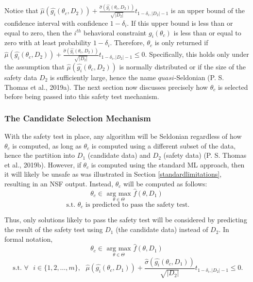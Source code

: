 \documentclass[12pt, twoside]{amherstthesis}
\begin{document}
Notice that \(\hat{\mu}(\hat{g_i}(\theta_c, D_2)) + \frac{\hat{\sigma}(\hat{g_i}(\theta_c, D_2))}{\sqrt{|D_2|}}t_{1-\delta_i, |D_2|-1}\) is an upper bound of the confidence interval with confidence \(1-\delta_i\). If this upper bound is less than or equal to zero, then the \(i^{th}\) behavioral constraint \(g_i(\theta_c)\) is less than or equal to zero with at least probability \(1-\delta_i\). Therefore, \(\theta_c\) is only returned if \(\hat{\mu}(\hat{g_i}(\theta_c, D_2)) + \frac{\hat{\sigma}(\hat{g_i}(\theta_c, D_2))}{\sqrt{|D_2|}}t_{1-\delta_i, |D_2|-1} \leq 0\). Specifically, this holds only under the assumption that \(\hat{\mu}(\hat{g_i}(\theta_c, D_2))\) is normally distributed or if the size of the safety data \(D_2\) is sufficiently large, hence the name \(\textit{quasi}\)-Seldonian (P. S. Thomas et al., 2019a). The next section now discusses precisely how \(\theta_c\) is selected before being passed into this safety test mechanism.

\hypertarget{candidate}{%
\subsubsection{The Candidate Selection Mechanism}\label{candidate}}

With the safety test in place, any algorithm will be Seldonian regardless of how \(\theta_c\) is computed, as long as \(\theta_c\) is computed using a different subset of the data, hence the partition into \(D_1\) (candidate data) and \(D_2\) (safety data) (P. S. Thomas et al., 2019b). However, if \(\theta_c\) is computed using the standard ML approach, then it will likely be unsafe as was illustrated in Section \ref{standardlimitations}, resulting in an NSF output. Instead, \(\theta_c\) will be computed as follows:
\begin{equation}
\label{ch2eq12}
\theta_c \in \underset{\theta \in \Theta}{\text{ arg max }} \hat{f}(\theta, D_1)
\end{equation}
\[\text{ s.t. } \theta_c \text{ is predicted to pass the safety test}.\]

Thus, only solutions likely to pass the safety test will be considered by predicting the result of the safety test using \(D_1\) (the candidate data) instead of \(D_2\). In formal notation,
\begin{equation}
\label{ch2eq13}
\theta_c \in \underset{\theta \in \Theta}{\text{ arg max }} \hat{f}(\theta, D_1)
\end{equation}
\[ \text{ s.t. } \forall \text{ } i \in \{1,2,\ldots,m\}, \text{  } \hat{\mu}(\hat{g_i}(\theta_c, D_1)) + \frac{\hat{\sigma}(\hat{g_i}(\theta_c, D_1))}{\sqrt{|D_2|}}t_{1-\delta_i, |D_2|-1} \leq 0. \]
\end{document}
